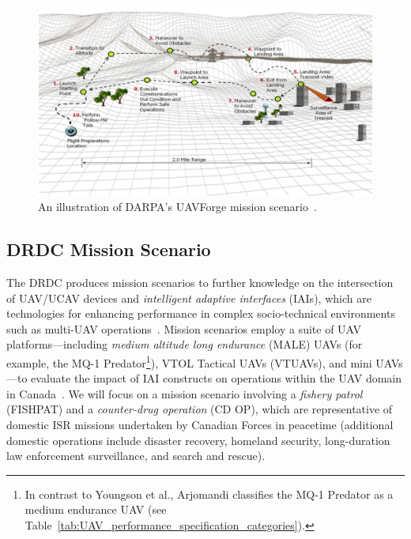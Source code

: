 \begin{figure}
\centering
\includegraphics[scale=1]{img/UAVForge-competition-course.png}
\caption[DARPA's UAVForge mission scenario]{An illustration of DARPA's UAVForge mission scenario~\cite{DARPA}.}
\label{fig:UAVForge_competition_course}
\end{figure}

\subsection{DRDC Mission Scenario}
\label{sec:DRDC_Mission_Scenario}

The DRDC produces mission scenarios to further knowledge on the intersection of UAV/UCAV devices and \emph{intelligent adaptive interfaces} (IAIs), which are technologies for enhancing performance in complex socio-technical environments such as multi-UAV operations~\cite{Hou_2006,Hou_2011}. Mission scenarios employ a suite of UAV platforms---including \emph{medium altitude long endurance} (MALE) UAVs (for example, the MQ-1 Predator\footnote{In contrast to Youngson et al., Arjomandi classifies the MQ-1 Predator as a medium endurance UAV (see Table~\ref{tab:UAV_performance_specification_categories}).}), VTOL Tactical UAVs (VTUAVs), and mini UAVs---to evaluate the impact of IAI constructs on operations within the UAV domain in Canada~\cite{Youngson_2004}. We will focus on a mission scenario involving a \emph{fishery patrol} (FISHPAT) and a \emph{counter-drug operation} (CD OP), which are representative of domestic ISR missions undertaken by Canadian Forces in peacetime (additional domestic operations include disaster recovery, homeland security, long-duration law enforcement surveillance, and search and rescue).

